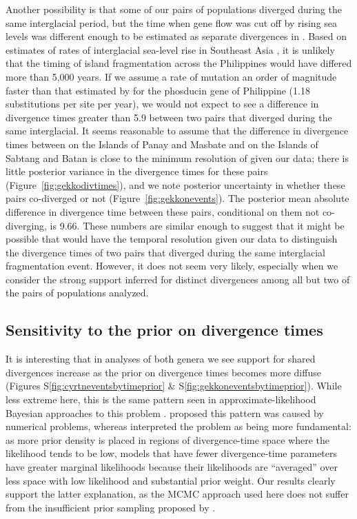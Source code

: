 Another possibility is that some of our pairs of populations diverged during
the same interglacial period, but the time when gene flow was cut off by rising
sea levels was different enough to be estimated as separate divergences in
\ecoevolity.
Based on estimates of rates of interglacial sea-level rise in Southeast Asia
\citep{Hanebuth2000,Sathiamurthy2006}, it is unlikely that the timing of
island fragmentation across the Philippines would have differed more than 5,000
years.
If we assume a rate of mutation an order of magnitude faster than that
estimated by \citet{Siler2012} for the phosducin gene of Philippine 
(1.18 substitutions per site per year),
we would not expect to see a difference in divergence times greater than
5.9
between two pairs that diverged during the same interglacial.
It seems reasonable to assume that the difference in divergence times between
 on the Islands of Panay and Masbate and
 on the Islands of Sabtang and Batan
is close to the minimum resolution of \ecoevolity given our data;
there is little posterior variance in the divergence times for these pairs
(Figure~\ref{fig:gekkodivtimes}),
and we note posterior uncertainty in whether these pairs co-diverged or not 
(Figure~\ref{fig:gekkonevents}).
The posterior mean absolute difference in divergence time between these pairs,
conditional on them not co-diverging, is
9.66.
These numbers are similar enough to suggest that it might be possible that
\ecoevolity would have the temporal resolution given our data to distinguish
the divergence times of two pairs that diverged during the same interglacial
fragmentation event.
However, it does not seem very likely, especially when we consider
the strong support inferred for distinct divergences among all but
two of the pairs of populations analyzed. 

\subsection{Sensitivity to the prior on divergence times}

It is interesting that in analyses of both genera we see support for shared
divergences increase as the prior on divergence times becomes more diffuse
(Figures
S\ref{fig:cyrtneventsbytimeprior}
\&
S\ref{fig:gekkoneventsbytimeprior}).
While less extreme here, this is the same pattern seen in
approximate-likelihood Bayesian approaches to this problem
\citep{Oaks2012,Hickerson2013,Oaks2014reply}.
\citet{Hickerson2013} proposed this pattern was caused by numerical problems,
whereas \citet{Oaks2014reply} interpreted the problem as being more
fundamental:
as more prior density is placed in regions of divergence-time space where the
likelihood tends to be low, models that have fewer divergence-time parameters
have greater marginal likelihoods because their likelihoods are ``averaged''
over less space with low likelihood and substantial prior weight.
Our results clearly support the latter explanation, as the MCMC approach used
here does not suffer from the insufficient prior sampling proposed by
\citet{Hickerson2013}.

